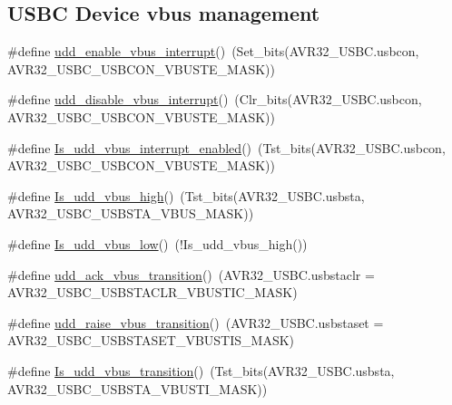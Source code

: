 \subsection*{\-U\-S\-B\-C \-Device vbus management}
\begin{DoxyCompactItemize}
\item 
\#define \hyperlink{group__udd__group_gaf80c5f873a9d926ab3324b6a91dfd872}{udd\-\_\-enable\-\_\-vbus\-\_\-interrupt}()~(\-Set\-\_\-bits(\-A\-V\-R32\-\_\-\-U\-S\-B\-C.\-usbcon, \-A\-V\-R32\-\_\-\-U\-S\-B\-C\-\_\-\-U\-S\-B\-C\-O\-N\-\_\-\-V\-B\-U\-S\-T\-E\-\_\-\-M\-A\-S\-K))
\item 
\#define \hyperlink{group__udd__group_gad11887e29c08ad9cc6d67e3e6b4f9e9a}{udd\-\_\-disable\-\_\-vbus\-\_\-interrupt}()~(\-Clr\-\_\-bits(\-A\-V\-R32\-\_\-\-U\-S\-B\-C.\-usbcon, \-A\-V\-R32\-\_\-\-U\-S\-B\-C\-\_\-\-U\-S\-B\-C\-O\-N\-\_\-\-V\-B\-U\-S\-T\-E\-\_\-\-M\-A\-S\-K))
\item 
\#define \hyperlink{group__udd__group_gaed8ac44b2b2082c1797e873e120867c8}{\-Is\-\_\-udd\-\_\-vbus\-\_\-interrupt\-\_\-enabled}()~(\-Tst\-\_\-bits(\-A\-V\-R32\-\_\-\-U\-S\-B\-C.\-usbcon, \-A\-V\-R32\-\_\-\-U\-S\-B\-C\-\_\-\-U\-S\-B\-C\-O\-N\-\_\-\-V\-B\-U\-S\-T\-E\-\_\-\-M\-A\-S\-K))
\item 
\#define \hyperlink{group__udd__group_ga10bc6d84d73e1ecccae3318d4098c41a}{\-Is\-\_\-udd\-\_\-vbus\-\_\-high}()~(\-Tst\-\_\-bits(\-A\-V\-R32\-\_\-\-U\-S\-B\-C.\-usbsta, \-A\-V\-R32\-\_\-\-U\-S\-B\-C\-\_\-\-U\-S\-B\-S\-T\-A\-\_\-\-V\-B\-U\-S\-\_\-\-M\-A\-S\-K))
\item 
\#define \hyperlink{group__udd__group_ga6f962d911e1863d143614d1ee01df89a}{\-Is\-\_\-udd\-\_\-vbus\-\_\-low}()~(!\-Is\-\_\-udd\-\_\-vbus\-\_\-high())
\item 
\#define \hyperlink{group__udd__group_gac6886b5956566ddb81744bbcfb27c08d}{udd\-\_\-ack\-\_\-vbus\-\_\-transition}()~(\-A\-V\-R32\-\_\-\-U\-S\-B\-C.\-usbstaclr = \-A\-V\-R32\-\_\-\-U\-S\-B\-C\-\_\-\-U\-S\-B\-S\-T\-A\-C\-L\-R\-\_\-\-V\-B\-U\-S\-T\-I\-C\-\_\-\-M\-A\-S\-K)
\item 
\#define \hyperlink{group__udd__group_ga8761342ea2dc32e0f0252508b1f7c47a}{udd\-\_\-raise\-\_\-vbus\-\_\-transition}()~(\-A\-V\-R32\-\_\-\-U\-S\-B\-C.\-usbstaset = \-A\-V\-R32\-\_\-\-U\-S\-B\-C\-\_\-\-U\-S\-B\-S\-T\-A\-S\-E\-T\-\_\-\-V\-B\-U\-S\-T\-I\-S\-\_\-\-M\-A\-S\-K)
\item 
\#define \hyperlink{group__udd__group_gafb6dd005e6fef2574f054b8fe5e8d008}{\-Is\-\_\-udd\-\_\-vbus\-\_\-transition}()~(\-Tst\-\_\-bits(\-A\-V\-R32\-\_\-\-U\-S\-B\-C.\-usbsta, \-A\-V\-R32\-\_\-\-U\-S\-B\-C\-\_\-\-U\-S\-B\-S\-T\-A\-\_\-\-V\-B\-U\-S\-T\-I\-\_\-\-M\-A\-S\-K))
\end{DoxyCompactItemize}

